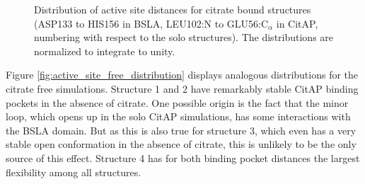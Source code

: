 \documentclass[english, a4paper, 12pt, titlepage, draft]{article}
\begin{document}
\begin{figure}
\begin{minipage}[]{0.45\linewidth}
    \end{minipage}
    \caption{Distribution of active site distances for citrate bound structures (ASP133 to HIS156 in BSLA, LEU102:N to GLU56:C$_{\alpha}$ in CitAP, numbering with respect to the solo structures).
    The distributions are normalized to integrate to unity.}
\label{fig:active_site_bound_distribution}
\end{figure}      



Figure \ref{fig:active_site_free_distribution} displays analogous distributions for the citrate free simulations.
Structure 1 and 2 have remarkably stable CitAP binding pockets in the absence of citrate.
One possible origin is the fact that the minor loop, which opens up in the solo CitAP simulations, has some interactions with the BSLA domain.
But as this is also true for structure 3, which even has a very stable open conformation in the absence of citrate, this is unlikely to be the only source of this effect.
Structure 4 has for both binding pocket distances the largest flexibility among all structures.
    
\end{document}
